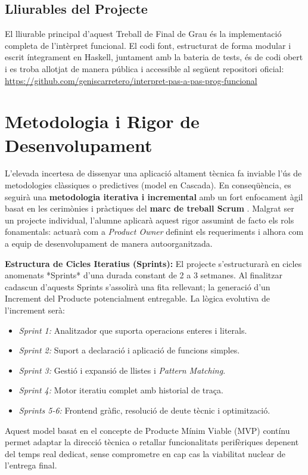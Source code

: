 \subsection{Lliurables del Projecte}
El lliurable principal d'aquest Treball de Final de Grau és la implementació completa de l'intèrpret funcional. El codi font, estructurat de forma modular i escrit íntegrament en Haskell, juntament amb la bateria de tests, és de codi obert i es troba allotjat de manera pública i accessible al següent repositori oficial: 
\url{https://github.com/geniscarretero/interpret-pas-a-pas-prog-funcional}

\section{Metodologia i Rigor de Desenvolupament}

L'elevada incertesa de dissenyar una aplicació altament tècnica fa inviable l'ús de metodologies clàssiques o predictives (model en Cascada). En conseqüència, es seguirà una \textbf{metodologia iterativa i incremental} amb un fort enfocament àgil basat en les cerimònies i pràctiques del \textbf{marc de treball Scrum} \cite{fib_modulo2}. Malgrat ser un projecte individual, l'alumne aplicarà aquest rigor assumint de facto els rols fonamentals: actuarà com a \textit{Product Owner} definint els requeriments i alhora com a equip de desenvolupament de manera autoorganitzada.

\textbf{Estructura de Cicles Iteratius (Sprints):} 
El projecte s'estructurarà en cicles anomenats *Sprints* d'una durada constant de 2 a 3 setmanes. Al finalitzar cadascun d'aquests Sprints s'assolirà una fita rellevant; la generació d'un Increment del Producte potencialment entregable. La lògica evolutiva de l'increment serà:
\begin{itemize}
    \item \textit{Sprint 1:} Analitzador que suporta operacions enteres i literals.
    \item \textit{Sprint 2:} Suport a declaració i aplicació de funcions simples.
    \item \textit{Sprint 3:} Gestió i expansió de llistes i \textit{Pattern Matching}.
    \item \textit{Sprint 4:} Motor iteratiu complet amb historial de traça.
    \item \textit{Sprints 5-6:} Frontend gràfic, resolució de deute tècnic i optimització.
\end{itemize}
Aquest model basat en el concepte de Producte Mínim Viable (MVP) contínu permet adaptar la direcció tècnica o retallar funcionalitats perifèriques depenent del temps real dedicat, sense comprometre en cap cas la viabilitat nuclear de l'entrega final.


